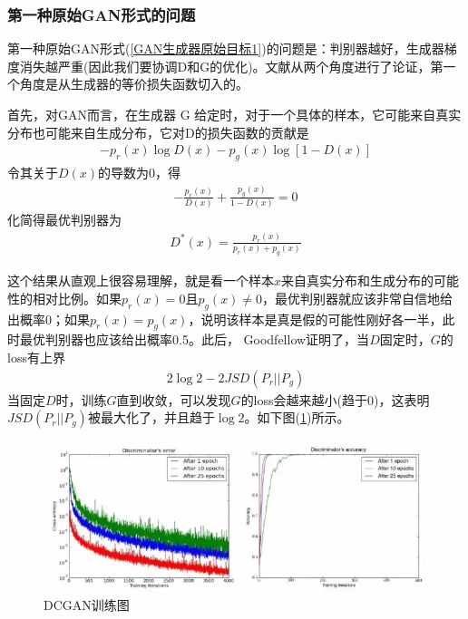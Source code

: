         \subsubsection{第一种原始GAN形式的问题}
            \par
            第一种原始GAN形式(\ref{GAN生成器原始目标1})的问题是：判别器越好，生成器梯度消失越严重(因此我们要协调D和G的优化)。文献\cite{2017.Arjovsky}从两个角度进行了论证，第一个角度是从生成器的等价损失函数切入的。
            \par
            首先，对GAN而言，在生成器 G 给定时，对于一个具体的样本，它可能来自真实分布也可能来自生成分布，它对D的损失函数的贡献是
            \begin{align*}
            -p_r(x)\log D(x) - p_g(x)\log [1-D(x)]
            \end{align*}
            令其关于$D(x)$的导数为0，得
            \begin{align*}
            -\frac{p_r(x)}{D(x)}+ \frac{p_g(x)}{1-D(x)}= 0
            \end{align*}
            化简得最优判别器为
            \begin{align}
            \label{最优判别器}
            D^*(x) = \frac{p_r(x)}{p_r(x)+p_g(x)}
            \end{align}
            \par
            这个结果从直观上很容易理解，就是看一个样本$ x $来自真实分布和生成分布的可能性的相对比例。如果$ p_r(x) = 0 $且$ p_g(x) \neq 0$，最优判别器就应该非常自信地给出概率0；如果$ p_r(x) = p_g(x)$，说明该样本是真是假的可能性刚好各一半，此时最优判别器也应该给出概率0.5。此后，
            Goodfellow证明了，当$D$固定时，$G$的loss有上界
            \begin{align*}
            2\log 2 - 2JSD(P_r||P_g)
            \end{align*}
            当固定$D$时，训练$G$直到收敛，可以发现$G$的loss会越来越小(趋于0)，这表明$JSD(P_r || P_g)$被最大化了，并且趋于$\log2$。如下图(\ref{fig:DCGAN梯度趋于0示意图})所示。
                \begin{figure}[H]
                \centering
                \includegraphics[width=14cm]{images/DCGAN_grandient0.jpg}
                \caption{DCGAN训练图}
                \label{fig:DCGAN梯度趋于0示意图}
                \end{figure}
